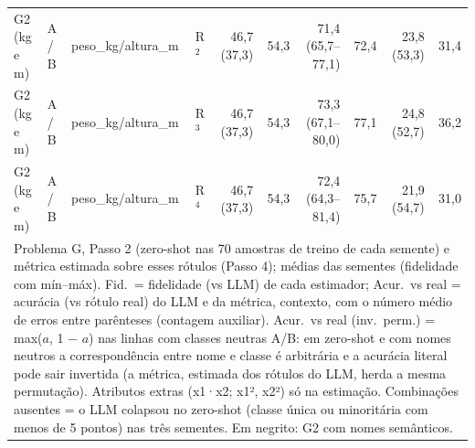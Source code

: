 \begin{table}[htbp]
\begin{tabular}{llllrrrrrr}
\midrule
G2 (kg e m) & A / B & peso\_kg/altura\_m & R$^2$ & 46,7 (37,3) & 54,3 & 71,4 (65,7–77,1) & 72,4 & 23,8 (53,3) & 31,4 \\
G2 (kg e m) & A / B & peso\_kg/altura\_m & R$^3$ & 46,7 (37,3) & 54,3 & 73,3 (67,1–80,0) & 77,1 & 24,8 (52,7) & 36,2 \\
G2 (kg e m) & A / B & peso\_kg/altura\_m & R$^4$ & 46,7 (37,3) & 54,3 & 72,4 (64,3–81,4) & 75,7 & 21,9 (54,7) & 31,0 \\
\bottomrule
\multicolumn{10}{p{0.95\linewidth}}{\footnotesize Problema G, Passo 2 (zero-shot nas 70 amostras de treino de cada semente) e métrica estimada sobre esses rótulos (Passo 4); médias das sementes (fidelidade com mín–máx). Fid.\ = fidelidade (vs LLM) de cada estimador; Acur.\ vs real = acurácia (vs rótulo real) do LLM e da métrica, contexto, com o número médio de erros entre parênteses (contagem auxiliar). Acur.\ vs real (inv.\ perm.) = max($a$, 1 $-$ $a$) nas linhas com classes neutras A/B: em zero-shot e com nomes neutros a correspondência entre nome e classe é arbitrária e a acurácia literal pode sair invertida (a métrica, estimada dos rótulos do LLM, herda a mesma permutação). Atributos extras (x1·x2; x1², x2²) só na estimação. Combinações ausentes = o LLM colapsou no zero-shot (classe única ou minoritária com menos de 5 pontos) nas três sementes. Em negrito: G2 com nomes semânticos.} \\
\end{tabular}
\end{table}
